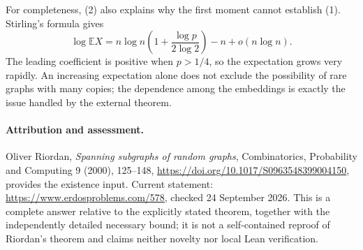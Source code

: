 For completeness, (2) also explains why the first moment cannot establish (1). Stirling's formula gives
\[
 \log\mathbb E X
 =n\log n\left(1+\frac{\log p}{2\log2}\right)-n+o(n\log n).
\]
The leading coefficient is positive when \(p>1/4\), so the expectation grows very rapidly. An increasing expectation alone does not exclude the possibility of rare graphs with many copies; the dependence among the embeddings is exactly the issue handled by the external theorem.

\paragraph{Attribution and assessment.}
Oliver Riordan, \emph{Spanning subgraphs of random graphs}, Combinatorics, Probability and Computing 9 (2000), 125--148, \url{https://doi.org/10.1017/S0963548399004150}, provides the existence input. Current statement: \url{https://www.erdosproblems.com/578}, checked 24 September 2026. This is a complete answer relative to the explicitly stated theorem, together with the independently detailed necessary bound; it is not a self-contained reproof of Riordan's theorem and claims neither novelty nor local Lean verification.
